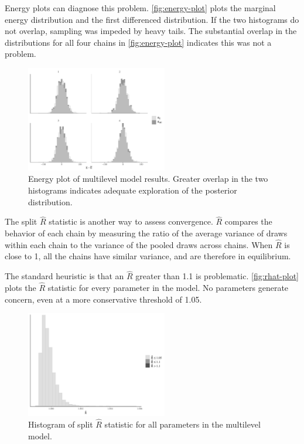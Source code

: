 \documentclass[12pt]{article}
\begin{document}
Energy plots can diagnose this problem. 
\autoref{fig:energy-plot} plots the marginal energy distribution and the first differenced distribution. 
If the two histograms do not overlap, sampling was impeded by heavy tails. 
The substantial overlap in the distributions for all four chains in \autoref{fig:energy-plot} indicates this was not a problem. 


\begin{figure}
	\centering
		\includegraphics[width=0.55\textwidth]{energy-plot.pdf}
	\caption{Energy plot of multilevel model results. Greater overlap in the two histograms indicates adequate exploration of the posterior distribution. }
	\label{fig:energy-plot}
\end{figure}


The split $\hat{R}$ statistic is another way to assess convergence. 
$\hat{R}$ compares the behavior of each chain by measuring the ratio of the average variance of draws within each chain to the variance of the pooled draws across chains. 
When $\hat{R}$ is close to 1, all the chains have similar variance, and are therefore in equilibrium. 


The standard heuristic is that an $\hat{R}$ greater than 1.1 is problematic. 
\autoref{fig:rhat-plot} plots the $\hat{R}$ statistic for every parameter in the model. 
No parameters generate concern, even at a more conservative threshold of 1.05. 


\begin{figure}[htbp]
	\centering
		\includegraphics[width=0.55\textwidth]{rhat-plot.pdf}
	\caption{Histogram of split $\hat{R}$ statistic for all parameters in the multilevel model.}
	\label{fig:rhat-plot}
\end{figure}
\end{document}
